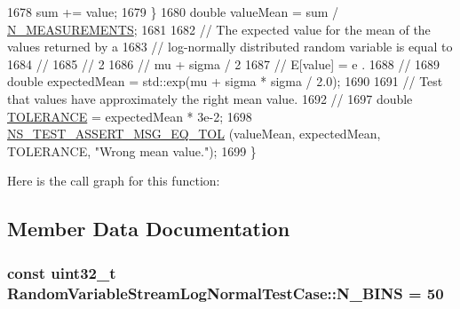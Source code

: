 \begin{DoxyCode}
1678       sum += value;
1679     \}
1680   \textcolor{keywordtype}{double} valueMean = sum / \hyperlink{classRandomVariableStreamLogNormalTestCase_a170a3082635604f00062bd8d4b0d7877}{N\_MEASUREMENTS};
1681 
1682   \textcolor{comment}{// The expected value for the mean of the values returned by a}
1683   \textcolor{comment}{// log-normally distributed random variable is equal to }
1684   \textcolor{comment}{//}
1685   \textcolor{comment}{//                             2}
1686   \textcolor{comment}{//                   mu + sigma  / 2}
1687   \textcolor{comment}{//     E[value]  =  e                 .}
1688   \textcolor{comment}{//}
1689   \textcolor{keywordtype}{double} expectedMean = std::exp(mu + sigma * sigma / 2.0);
1690 
1691   \textcolor{comment}{// Test that values have approximately the right mean value.}
1692   \textcolor{comment}{//}
1697 \textcolor{comment}{}  \textcolor{keywordtype}{double} \hyperlink{spectrum-value-test_8cc_a30c17564229ec2e37dfea9c6c9ad643e}{TOLERANCE} = expectedMean * 3e-2;
1698   \hyperlink{group__testing_ga9e7861b56b4e70db3b56044cb7a28e41}{NS\_TEST\_ASSERT\_MSG\_EQ\_TOL} (valueMean, expectedMean, TOLERANCE, \textcolor{stringliteral}{"Wrong mean
       value."}); 
1699 \}
\end{DoxyCode}


Here is the call graph for this function\+:




\subsection{Member Data Documentation}
\subsubsection[{\texorpdfstring{N\+\_\+\+B\+I\+NS}{N_BINS}}]{\setlength{\rightskip}{0pt plus 5cm}const uint32\+\_\+t Random\+Variable\+Stream\+Log\+Normal\+Test\+Case\+::\+N\+\_\+\+B\+I\+NS = 50\hspace{0.3cm}{\ttfamily [static]}}\hypertarget{classRandomVariableStreamLogNormalTestCase_a311c48bf6172114ca16e35c3b4c35f5a}{}\label{classRandomVariableStreamLogNormalTestCase_a311c48bf6172114ca16e35c3b4c35f5a}
